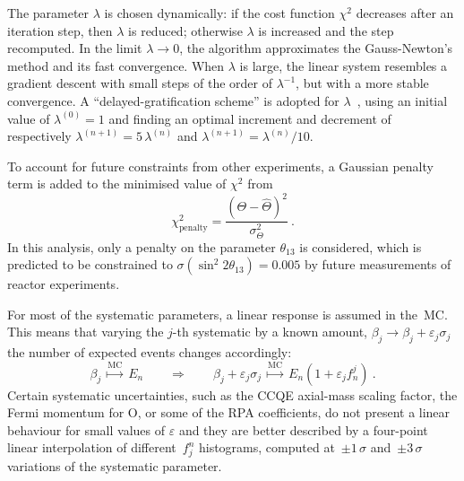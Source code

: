 The parameter $\lambda$ is chosen dynamically: if the cost function $\chi^2$ decreases %
after an iteration step, then $\lambda$ is reduced; otherwise $\lambda$ is increased and the step recomputed.
In the limit $\lambda \to 0$, the algorithm approximates the Gauss-Newton's method and its fast convergence.
When $\lambda$ is large, the linear system resembles a gradient descent with small steps of the order of $\lambda^{-1}$, %
but with a more stable convergence.
A ``delayed-gratification scheme'' is adopted for $\lambda$~\cite{Transtrum2012}, using an initial value of $\lambda^{(0)} = 1$ and finding %
an optimal increment and decrement of respectively $\lambda^{(n+1)} = 5\,\lambda^{(n)}$ and $\lambda^{(n+1)} = \lambda^{(n)} / 10$.

To account for future constraints from other experiments, a Gaussian penalty term is added %
to the minimised value of $\chi^2$ from 
\begin{equation}
	\chi^2_\text{penalty} = \frac{(\Theta - \hat{\Theta})^2}{\sigma_\Theta^2}\ .
\end{equation}
In this analysis, only a penalty on the parameter $\theta_{13}$ is considered, %
which is predicted to be constrained to $\sigma(\sin^2 2\theta_{13}) = 0.005$ by future measurements of reactor experiments.

For most of the systematic parameters, a linear response is assumed in the~MC.
This means that varying the $j$-th systematic by a known amount, $\beta_j \to \beta_j + \varepsilon_j\sigma_j$ %
the number of expected events changes accordingly:
\begin{equation}
	\label{eq:linear}
	\beta_j\ \overset{\scriptstyle \text{MC}}{\longmapsto}\ E_n %
	\qquad \Longrightarrow \qquad %
	\beta_j + \varepsilon_j\sigma_j\ \overset{\text{MC}}{\longmapsto}\ E_n ( 1 + \varepsilon_j f_n ^j )\ .
\end{equation}
Certain systematic uncertainties, such as the CCQE axial-mass scaling factor, the Fermi momentum for O, %
or some of the RPA coefficients, %
do not present a linear behaviour for small values of $\varepsilon$ %
and they are better described by a four-point linear interpolation of different~$f_j^n$ histograms, %
computed at~$\pm1\,\sigma$ and~$\pm3\,\sigma$ variations of the systematic parameter.

